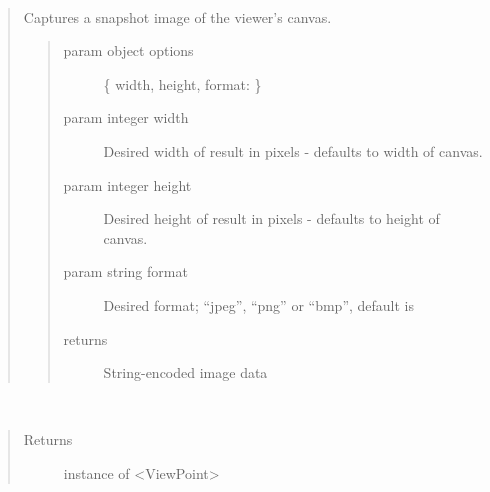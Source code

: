 \documentclass[a4paper,12pt,english]{sphinxmanual}
\begin{document}
\begin{fulllineitems}
\label{\detokenize{viewer/parameters:BIMDataViewer.getSnapshot}}~\begin{quote}

Captures a snapshot image of the viewer’s canvas.
\begin{quote}\begin{description}
\item[{param object options}] \leavevmode
\{  width,  height,  format:  \}

\item[{param integer width}] \leavevmode
Desired width of result in pixels - defaults to width of canvas.

\item[{param integer height}] \leavevmode
Desired height of result in pixels - defaults to height of canvas.

\item[{param string format}] \leavevmode
Desired format; “jpeg”, “png” or “bmp”, default is 

\item[{returns}] \leavevmode
{} String-encoded image data

\end{description}\end{quote}
\end{quote}

%
\begin{sphinxVerbatim}[commandchars=\\\{\}]
  
     
     
     
\end{sphinxVerbatim}

\end{fulllineitems}



\begin{fulllineitems}
\label{\detokenize{viewer/parameters:BIMDataViewer.getViewpoint}}~\begin{quote}\begin{description}
\item[{Returns}] \leavevmode
{} instance of \textless{}ViewPoint\textgreater{}

\end{description}\end{quote}

\end{fulllineitems}
\end{document}
